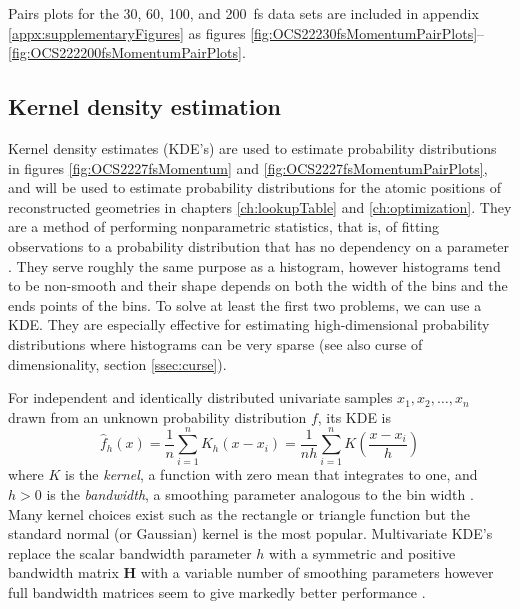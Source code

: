 Pairs plots for the 30, 60, 100, and \SI{200}{\fs} data sets are included in appendix \ref{appx:supplementaryFigures} as figures \ref{fig:OCS22230fsMomentumPairPlots}--\ref{fig:OCS222200fsMomentumPairPlots}.

\subsection{Kernel density estimation} \label{sec:kde}
Kernel density estimates (KDE's) are used to estimate probability distributions in figures \ref{fig:OCS2227fsMomentum} and \ref{fig:OCS2227fsMomentumPairPlots}, and will be used to estimate probability distributions for the atomic positions of reconstructed geometries in chapters \ref{ch:lookupTable} and \ref{ch:optimization}. They are a method of performing nonparametric statistics, that is, of fitting observations to a probability distribution that has no dependency on a parameter \citep[\S 20.2-20.3]{Kendall99}. They serve roughly the same purpose as a histogram, however histograms tend to be non-smooth and their shape depends on both the width of the bins and the ends points of the bins. To solve at least the first two problems, we can use a KDE. They are especially effective for estimating high-dimensional probability distributions where histograms can be very sparse (see also curse of dimensionality, section \ref{ssec:curse}).

For independent and identically distributed univariate samples $x_1, x_2, \dots, x_n$ drawn from an unknown probability distribution $f$, its KDE is
\begin{equation}
\hat{f}_h(x) = \frac{1}{n} \sum_{i=1}^n K_h(x-x_i)
= \frac{1}{nh} \sum_{i=1}^n K\left(\frac{x - x_i}{h}\right)
\end{equation}
where $K$ is the \emph{kernel}, a function with zero mean that integrates to one, and $h > 0$ is the \emph{bandwidth}, a smoothing parameter analogous to the bin width \citep[p. 137]{Scott15}. Many kernel choices exist such as the rectangle or triangle function but the standard normal (or Gaussian) kernel is the most popular. Multivariate KDE's replace the scalar bandwidth parameter $h$ with a symmetric and positive bandwidth matrix $\mathbf{H}$ with a variable number of smoothing parameters \citep{Wand93} however full bandwidth matrices seem to give markedly better performance \citep{Duong03}.


